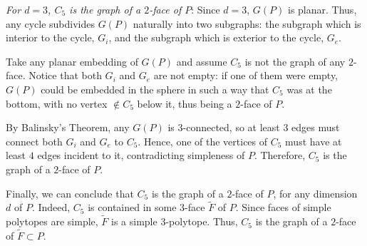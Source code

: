 \documentclass[11pt]{amsart}
\theoremstyle{definition}
\begin{document}
\emph{For $d=3$, $C_5$ is the graph of a $2$-face of $P$}:
Since $d=3$, $G(P)$ is planar. Thus, any cycle subdivides $G(P)$ naturally into two subgraphs: the subgraph which is interior to the cycle, $G_i$, and the subgraph which is exterior to the cycle, $G_e$.

Take any planar embedding of $G(P)$ and assume $C_5$ is not the graph of any $2$-face. Notice that both $G_i$ and $G_e$ are not empty: if one of them were empty, $G(P)$ could be embedded in the sphere in such a way that $C_5$ was at the bottom, with no vertex $\notin C_5$ below it, thus being a $2$-face of $P$.

By Balinsky's Theorem, any $G(P)$ is $3$-connected, so at least $3$ edges must connect both $G_i$ and $G_e$ to $C_5$. Hence, one of the vertices of $C_5$ must have at least $4$ edges incident to it, contradicting simpleness of $P$. Therefore, $C_5$ is the graph of a $2$-face of $P$.

Finally, we can conclude that $C_5$ is the graph of a $2$-face of $P$, for any dimension $d$ of $P$. Indeed, $C_5$ is contained in some $3$-face $\tilde{F}$ of $P$. Since faces of simple polytopes are simple, $\tilde{F}$ is a simple $3$-polytope. Thus, $C_5$ is the graph of a $2$-face of $\tilde{F}\subset P$.
\bigskip

% 
% 
% 
\end{document}
